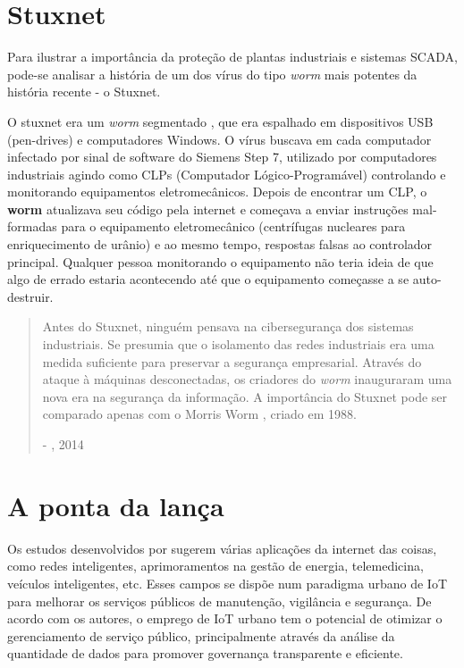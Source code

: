 \documentclass[tcc,capa]{texufpel}
\begin{document}
\section{Stuxnet}

Para ilustrar a importância da proteção de plantas industriais e sistemas SCADA, pode-se analisar a história de um dos vírus do tipo \textit{worm} mais potentes da história recente - o Stuxnet.

O stuxnet era um \textit{worm} segmentado \cite{stuxnet_kaspersky}, que era espalhado em dispositivos USB (pen-drives) e computadores Windows. O vírus buscava em cada computador infectado por sinal de software do Siemens Step 7, utilizado por computadores industriais agindo como CLPs (Computador Lógico-Programável) controlando e monitorando equipamentos eletromecânicos. Depois de encontrar um CLP, o \textbf{worm} atualizava seu código pela internet e começava a enviar instruções mal-formadas para o equipamento eletromecânico (centrífugas nucleares para enriquecimento de urânio) e ao mesmo tempo, respostas falsas ao controlador principal. Qualquer pessoa monitorando o equipamento não teria ideia de que algo de errado estaria acontecendo até que o equipamento começasse a se auto-destruir.

\begin{quote}
 Antes do Stuxnet, ninguém pensava na cibersegurança dos sistemas industriais. Se presumia que o isolamento das redes industriais era uma medida suficiente para preservar a segurança empresarial. Através do ataque à máquinas desconectadas, os criadores do \textit{worm} inauguraram uma nova era na segurança da informação. A importância do Stuxnet pode ser comparado apenas com o Morris Worm , criado em 1988.

 - \citeauthor{stuxnet_kaspersky}, 2014
\end{quote}

\section{A ponta da lança}

Os estudos desenvolvidos por \citet{smart_cities} sugerem várias aplicações da internet das coisas, como redes inteligentes, aprimoramentos na gestão de energia, telemedicina, veículos inteligentes, etc. Esses campos se dispõe num paradigma urbano de IoT para melhorar os serviços públicos de manutenção, vigilância e segurança. De acordo com os autores, o emprego de IoT urbano tem o potencial de otimizar o gerenciamento de serviço público, principalmente através da análise da quantidade de dados para promover governança transparente e eficiente. 
\end{document}
